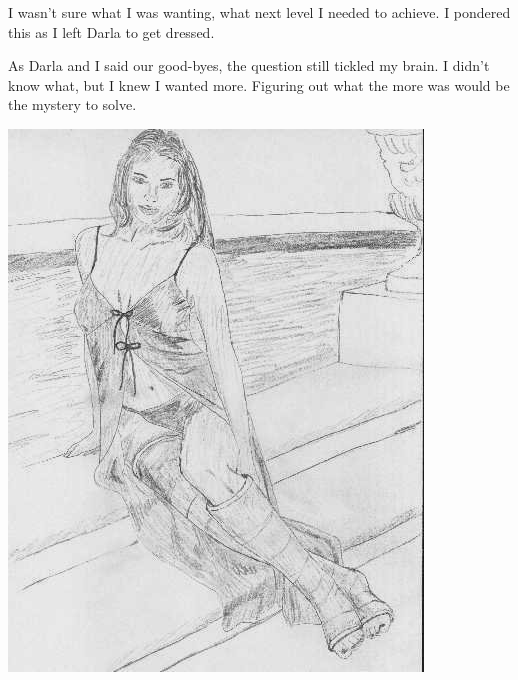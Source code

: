 I wasn't sure what I was wanting, what next level I needed to achieve. I pondered this as I
left Darla to get dressed.

As Darla and I said our good-byes, the question still tickled my brain. I didn't know what,
but I knew I wanted more. Figuring out what the more was would be the mystery to solve.

\newpage
\begin{center}
\includegraphics{images/kicks13.jpg}
\end{center}
